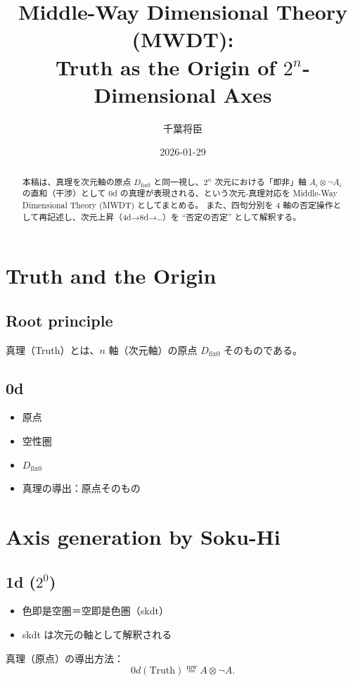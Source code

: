 \documentclass[uplatex,dvipdfmx,12pt,a4paper]{jsarticle}
\title{Middle-Way Dimensional Theory (MWDT):\\
Truth as the Origin of $2^n$-Dimensional Axes}
\author{千葉将臣}
\date{2026-01-29}
\newcommand{\dfix}{D_{\text{fix0}}}
\newcommand{\mweq}{\mathrel{\overset{\mathrm{mw}}{=}}}
\begin{document}
\maketitle

\begin{abstract}
本稿は、真理を次元軸の原点 $\dfix$ と同一視し、$2^n$ 次元における「即非」軸 $A_i\otimes\neg A_i$ の直和（干渉）として $0$d の真理が表現される、という次元‐真理対応を Middle-Way Dimensional Theory (MWDT) としてまとめる。
また、四句分別を $4$ 軸の否定操作として再記述し、次元上昇（4d→8d→…）を ``否定の否定'' として解釈する。
\end{abstract}

\section{Truth and the Origin}
\subsection{Root principle}
真理（Truth）とは、$n$ 軸（次元軸）の原点 $\dfix$ そのものである。

\subsection{0d}
\begin{itemize}
  \item 原点
  \item 空性圏
  \item $\dfix$
  \item 真理の導出：原点そのもの
\end{itemize}

\section{Axis generation by Soku-Hi}
\subsection{1d ($2^0$)}
\begin{itemize}
  \item 色即是空圏＝空即是色圏（skdt）
  \item skdt は次元の軸として解釈される
\end{itemize}

真理（原点）の導出方法：
\begin{equation}
  0d(\text{Truth}) \mweq A\otimes \neg A.
\end{equation}
\end{document}
